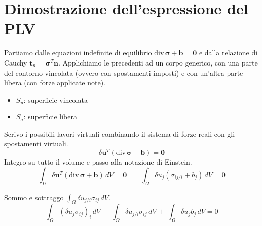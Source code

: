 \section{Dimostrazione dell'espressione del PLV}

Partiamo dalle equazioni indefinite di equilibrio $\mathrm{div}\,\boldsymbol{\sigma} + \mathbf{b} = \mathbf{0}$ e dalla relazione di Cauchy $\mathbf{t}_n = \boldsymbol{\sigma}^T \mathbf{n}$. Applichiamo le precedenti ad un corpo generico, con una parte del contorno vincolata (ovvero con spostamenti imposti) e con un'altra parte libera (con forze applicate note).

\begin{itemize}
    \item $S_u$: superficie vincolata 
    
    \item $S_{\sigma}$: superficie libera 
\end{itemize}

Scrivo i possibili lavori virtuali combinando il sistema di forze reali con gli spostamenti virtuali.
\begin{equation*}
    \delta \mathbf{u}^T (\mathrm{div}\,\boldsymbol{\sigma} + \mathbf{b}) = \mathbf{0}
\end{equation*}
Integro su tutto il volume e passo alla notazione di Einstein.
\begin{equation*}
    \int_{\Omega} \delta \mathbf{u}^T \left( \mathrm{div}\,\boldsymbol{\sigma} + \mathbf{b} \right) \, dV = \mathbf{0}
    \quad\quad
    \int_{\Omega} \delta u_j \left( \sigma_{ij/i} + b_j \right) \, dV = 0
\end{equation*}

Sommo e sottraggo $\int_{\Omega} \delta u_{j/i}  \sigma_{ij}  \, dV$.
\begin{equation*}
    \int_{\Omega}  \left(\delta u_j \sigma_{ij}  \right)_i \, dV  \, -\,\int_{\Omega} \delta u_{j/i}  \sigma_{ij}  \, dV \, + \, 
    \int_{\Omega} \delta u_{j}  b_j  \, dV= 0
\end{equation*}

